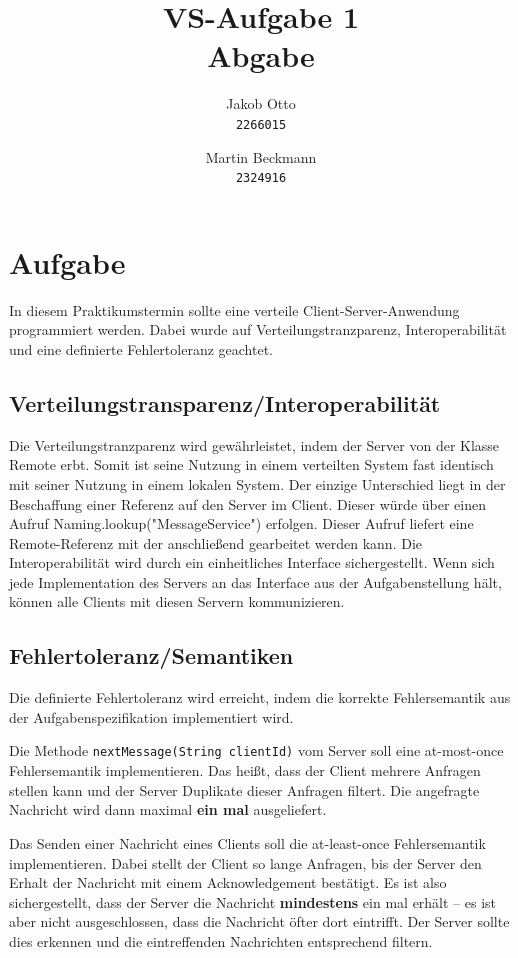 \documentclass[a4paper, 12pt]{scrartcl}
\author{Jakob Otto\\
	\texttt{2266015} \and Martin Beckmann\\
	\texttt{2324916}}
\title{VS-Aufgabe 1\\
       Abgabe}
\begin{document}
\maketitle
\newpage
	
\section{Aufgabe}
In diesem Praktikumstermin sollte eine verteile Client-Server-Anwendung programmiert werden. Dabei wurde auf Verteilungstranzparenz, Interoperabilität und eine definierte Fehlertoleranz geachtet.

\subsection{Verteilungstransparenz/Interoperabilität}
Die Verteilungstranzparenz wird gewährleistet, indem der Server von der Klasse Remote erbt. Somit ist seine Nutzung in einem verteilten System fast identisch mit seiner Nutzung in einem lokalen System. Der einzige Unterschied liegt in der Beschaffung einer Referenz auf den Server im Client. Dieser würde über einen Aufruf Naming.lookup("MessageService") erfolgen. Dieser Aufruf liefert eine Remote-Referenz mit der anschließend gearbeitet werden kann.
Die Interoperabilität wird durch ein einheitliches Interface sichergestellt. Wenn sich jede Implementation des Servers an das Interface aus der Aufgabenstellung hält, können alle Clients mit diesen Servern kommunizieren.

\subsection{Fehlertoleranz/Semantiken}
Die definierte Fehlertoleranz wird erreicht, indem die korrekte Fehlersemantik aus der Aufgabenspezifikation implementiert wird.

Die Methode \lstinline|nextMessage(String clientId)| vom Server soll eine \glqq{}at-most-once\grqq{} Fehlersemantik implementieren. Das heißt, dass der Client mehrere Anfragen stellen kann und der Server Duplikate dieser Anfragen filtert. Die angefragte Nachricht wird dann maximal \textbf{ein mal} ausgeliefert.

Das Senden einer Nachricht eines Clients soll die \glqq{}at-least-once\grqq{} Fehlersemantik implementieren. Dabei stellt der Client so lange Anfragen, bis der Server den Erhalt der Nachricht mit einem Acknowledgement bestätigt. Es ist also sichergestellt, dass der Server die Nachricht \textbf{mindestens} ein mal erhält -- es ist aber nicht ausgeschlossen, dass die Nachricht öfter dort eintrifft. Der Server sollte dies erkennen und die eintreffenden Nachrichten entsprechend filtern.
\end{document}

